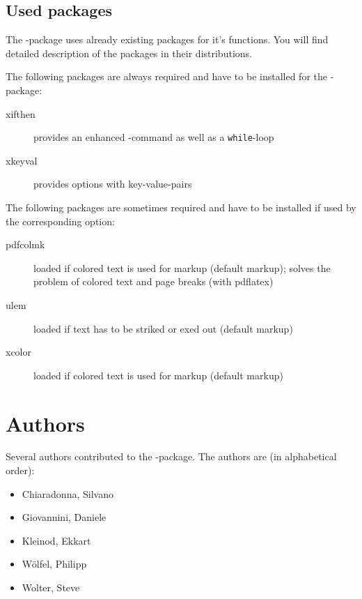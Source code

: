 \subsection{Used packages}
\label{sec:user:packages}

The -package uses already existing packages for it's functions.
You will find detailed description of the packages in their distributions.

The following packages are always required and have to be installed for the -package:
\begin{description}
	\item [xifthen] provides an enhanced -command as well as a \texttt{while}-loop
	\item [xkeyval] provides options with key-value-pairs
\end{description}

The following packages are sometimes required and have to be installed if used by the corresponding option:
\begin{description}
	\item [pdfcolmk] loaded if colored text is used for markup (default markup); solves the problem of colored text and page breaks (with pdflatex)
	\item [ulem] loaded if text has to be striked or exed out (default markup)
	\item [xcolor] loaded if colored text is used for markup (default markup)
\end{description}


\section{Authors}
\label{sec:authors}

Several authors contributed to the -package.
The authors are (in alphabetical order):
\begin{itemize}
	\item Chiaradonna, Silvano
	\item Giovannini, Daniele
	\item Kleinod, Ekkart
	\item Wölfel, Philipp
	\item Wolter, Steve
\end{itemize}



